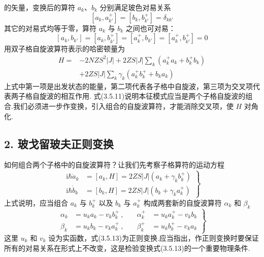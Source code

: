 的矢量，变换后的算符 $a_k$、$b_k$ 分别满足玻色对易关系
\begin{equation}
  \left[a_k,a_{k'}^{+}\right]=\left[b_k,b_{k'}^{+}\right]=\delta_{kk'}
\end{equation}
其它的对易式均等于零，算符 $a_k$ 与 $b_k$ 之间也可对易：
\begin{equation}
  \left[a_k,b_{k'}\right]=\left[a_k,b_{k'}^{+}\right]=\left[a_k^{+},b_{k'}\right]=\left[a_k^{+},b_{k'}^{+}\right]=0
\end{equation}
用双子格自旋波算符表示的哈密顿量为
\begin{equation}
\begin{aligned}
  H={}&-2NZS^2\left|J\right|+2ZS\left|J\right|\sum_k\left(a_k^{+}a_k+b_k^{+}b_k\right)\\
  &+2ZS\left|J\right|\sum_k\gamma_k\left(a_k^{+}b_k^{+}+b_ka_k\right)
\end{aligned}
\end{equation}
上式中第一项是出发状态的能量，第二项代表各子格中自旋波，第三项为交叉项代表两子格自旋波的相互作用.
式(3.5.11)说明本征模式应当是两个子格自旋波的组合.我们必须进一步作变换，引入组合的自旋波算符，才能消除交叉项，使
$H$ 对角化.

\subsection*{2. 玻戈留玻夫正则变换}

如何组合两个子格中的自旋波算符？让我们先考察子格算符的运动方程
\begin{equation}
  \left.\begin{aligned}
    \mathrm{i}\hbar\dot{a}_k&=\left[a_k,H\right]=2ZS\left|J\right|\left(a_k+\gamma_kb_k^{+}\right)\\
    \mathrm{i}\hbar\dot{b}_k&=\left[b_k,H\right]=2ZS\left|J\right|\left(b_k+\gamma_ka_k^{+}\right)
  \end{aligned}\right\}
\end{equation}
上式说明，应当组合 $a_k$ 与 $b_k^{+}$ 以及 $b_k$ 与 $a_k^{+}$
构成两套新的自旋波算符 $\alpha_k$ 和 $\beta_k$
\begin{equation}
  \left.\begin{aligned}
    \alpha_k&=u_ka_k-v_kb_k^{+}\ ,&\quad \alpha_k^{+}&=u_ka_k^{+}-v_kb_k\\
    \beta_k&=u_kb_k-v_ka_k^{+}\ ,&\quad \beta_k^{+}&=u_kb_k^{+}-v_ka_k
  \end{aligned}\right\}
\end{equation}
这里 $u_k$ 和 $v_k$ 设为实函数，式(3.5.13)为正则变换.应当指出，作正则变换时要保证所有的对易关系在形式上不改变，这是检验变换式(3.5.13)的一个重要物理条件.

